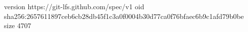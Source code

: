 version https://git-lfs.github.com/spec/v1
oid sha256:2657611897ceb6cb28db45f1c3a0f0004b30d77ca0f76bfaec6b9c1afd79b0be
size 4707
